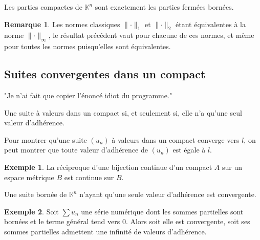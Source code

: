 \documentclass[french]{article}
\newcommand{\N}{\mathbb{N}}
\newcommand{\K}{\mathbb{K}}
\newcommand{\inv}{^{-1}}
\theoremstyle{plain}
\theoremstyle{definition}
\newtheorem*{ex}{Exemple}
\newtheorem*{rmq}{Remarque}
\theoremstyle{remark}
\begin{document}
\begin{thm}%
	Les parties compactes de $\K^n$ sont exactement les parties fermées bornées.
\end{thm}

\begin{rmq}
	Les normes classiques $\lVert\cdot\rVert_1$ et $\lVert\cdot\rVert_2$ étant équivalentes à la norme $\lVert\cdot\rVert_\infty$, le résultat précédent vaut pour chacune de ces normes, et même pour toutes les normes puisqu'elles sont équivalentes.
\end{rmq}

\subsection{Suites convergentes dans un compact}

"Je n'ai fait que copier l'énoncé idiot du programme."

\begin{thm}%
	Une suite à valeurs dans un compact si, et seulement si, elle n'a qu'une seul valeur d'adhérence.
\end{thm}

\begin{met}
	Pour montrer qu'une suite $(u_n)$ à valeurs dans un compact converge vers $l$, on peut montrer que toute valeur d'adhérence de $(u_n)$ est égale à $l$.
\end{met}

\begin{ex}
	La réciproque d'une bijection continue d'un compact $A$ sur un espace métrique $B$ est continue sur $B$.
\end{ex}

\begin{cor}%
	Une suite bornée de $\K^n$ n'ayant qu'une seule valeur d'adhérence est convergente.
\end{cor}

\begin{ex}
	Soit $\displaystyle\sum u_n$ une série numérique dont les sommes partielles sont bornées et le terme général tend vers $0$. Alors soit elle est convergente, soit ses sommes partielles admettent une infinité de valeurs d'adhérence.
\end{ex}
\end{document}
